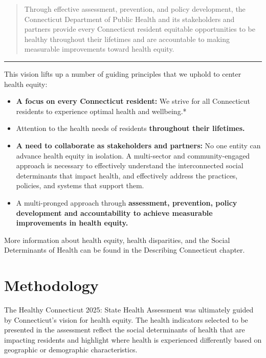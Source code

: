 \documentclass[
  letterpaper,
  DIV=11,
  numbers=noendperiod]{scrreprt}
\begin{document}
\begin{quote}
Through effective assessment, prevention, and policy development, the
Connecticut Department of Public Health and its stakeholders and
partners provide every Connecticut resident equitable opportunities to
be healthy throughout their lifetimes and are accountable to making
measurable improvements toward health equity.
\end{quote}

\begin{center}\rule{0.5\linewidth}{0.5pt}\end{center}

This vision lifts up a number of guiding principles that we uphold to
center health equity:

\begin{itemize}
\item
  \textbf{A focus on every Connecticut resident:} We strive for all
  Connecticut residents to experience optimal health and wellbeing.*
\item
  Attention to the health needs of residents \textbf{throughout their
  lifetimes.}
\item
  \textbf{A need to collaborate as stakeholders and partners:} No one
  entity can advance health equity in isolation. A multi-sector and
  community-engaged approach is necessary to effectively understand the
  interconnected social determinants that impact health, and effectively
  address the practices, policies, and systems that support them.
\item
  A multi-pronged approach through \textbf{assessment, prevention,
  policy development and accountability to achieve measurable
  improvements in health equity.}
\end{itemize}

More information about health equity, health disparities, and the Social
Determinants of Health can be found in the Describing Connecticut
chapter.

\section{Methodology}\label{methodology}

The Healthy Connecticut 2025: State Health Assessment was ultimately
guided by Connecticut's vision for health equity. The health indicators
selected to be presented in the assessment reflect the social
determinants of health that are impacting residents and highlight where
health is experienced differently based on geographic or demographic
characteristics.
\end{document}

